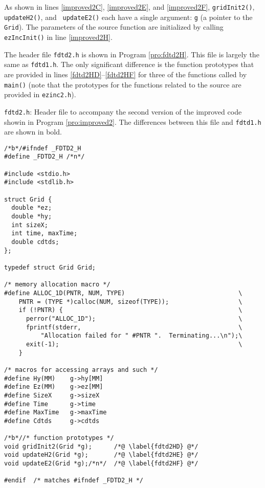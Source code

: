 As shown in lines \ref{improved2C}, \ref{improved2E}, and
\ref{improved2F}, {\tt gridInit2()}, {\tt updateH2()}, and {\tt
  updateE2()} each have a single argument: {\tt g} (a pointer to the
{\tt Grid}).  The parameters of the source function are initialized by
calling {\tt ezIncInit()} in line \ref{improved2H}.

The header file {\tt fdtd2.h} is shown in Program \ref{pro:fdtd2H}.
This file is largely the same as {\tt fdtd1.h}.  The only significant
difference is the function prototypes that are provided in lines
\ref{fdtd2HD}--\ref{fdtd2HF} for three of the functions called by {\tt
  main()} (note that the prototypes for the functions related to the
source are provided in {\tt ezinc2.h}).

\begin{program} {\tt fdtd2.h}: Header file to accompany the second
  version of the improved code showin in Program \ref{pro:improved2}.
  The differences between this file and {\tt fdtd1.h} are shown in
  bold. \label{pro:fdtd2H} \codemiddle
\begin{lstlisting}
/*b*/#ifndef _FDTD2_H
#define _FDTD2_H /*n*/

#include <stdio.h>
#include <stdlib.h>

struct Grid {
  double *ez;
  double *hy;
  int sizeX;
  int time, maxTime;
  double cdtds;
};

typedef struct Grid Grid;

/* memory allocation macro */
#define ALLOC_1D(PNTR, NUM, TYPE)                               \
    PNTR = (TYPE *)calloc(NUM, sizeof(TYPE));                   \
    if (!PNTR) {                                                \
      perror("ALLOC_1D");                                       \
      fprintf(stderr,                                           \
          "Allocation failed for " #PNTR ".  Terminating...\n");\
      exit(-1);                                                 \
    }

/* macros for accessing arrays and such */
#define Hy(MM)    g->hy[MM]
#define Ez(MM)    g->ez[MM]
#define SizeX     g->sizeX 
#define Time      g->time  
#define MaxTime   g->maxTime
#define Cdtds     g->cdtds

/*b*//* function prototypes */
void gridInit2(Grid *g);      /*@ \label{fdtd2HD} @*/
void updateH2(Grid *g);       /*@ \label{fdtd2HE} @*/
void updateE2(Grid *g);/*n*/  /*@ \label{fdtd2HF} @*/

#endif  /* matches #ifndef _FDTD2_H */
\end{lstlisting}
\end{program}

